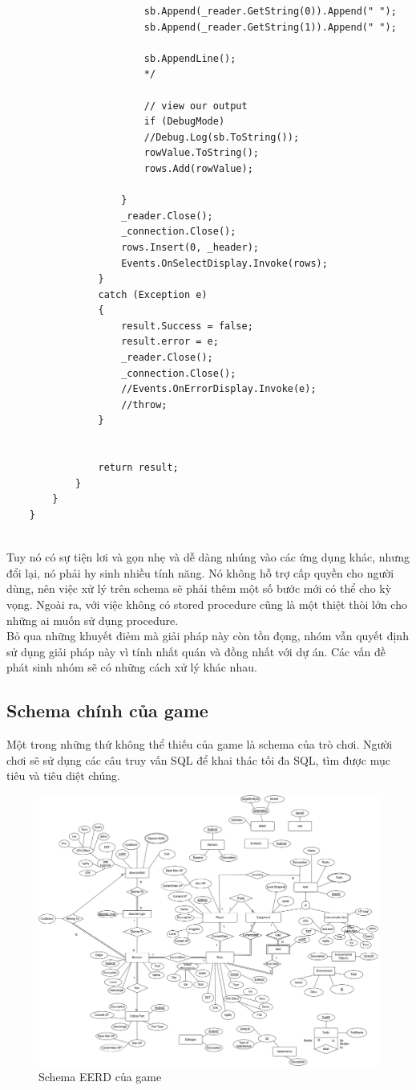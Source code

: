 \begin{verbatim}
						sb.Append(_reader.GetString(0)).Append(" ");
						sb.Append(_reader.GetString(1)).Append(" ");
						
						sb.AppendLine();
						*/
						
						// view our output
						if (DebugMode)
						//Debug.Log(sb.ToString());
						rowValue.ToString();
						rows.Add(rowValue);
						
					}
					_reader.Close();
					_connection.Close();
					rows.Insert(0, _header);
					Events.OnSelectDisplay.Invoke(rows);
				}
				catch (Exception e)
				{
					result.Success = false;
					result.error = e;
					_reader.Close();
					_connection.Close();
					//Events.OnErrorDisplay.Invoke(e);
					//throw;
				}
				
				
				return result;
			}
		}
	}
	
\end{verbatim}
\hspace*{0.5cm} Tuy nó có sự tiện lơi và gọn nhẹ và dễ dàng nhúng vào các ứng dụng khác, nhưng đổi lại, nó phải hy sinh nhiều tính năng. Nó không hỗ trợ cấp quyền cho người dùng, nên việc xử lý trên schema sẽ phải thêm một số bước mới có thể cho kỳ vọng. Ngoài ra, với việc không có stored procedure cũng là một thiệt thòi lớn cho những ai muốn sử dụng procedure.\\
\hspace*{0.5cm} Bỏ qua những khuyết điẻm mà giải pháp này còn tồn đọng, nhóm vẫn quyết định sử dụng giải pháp này vì tính nhất quán và đồng nhất với dự án. Các vấn đề phát sinh nhóm sẽ có những cách xử lý khác nhau.
\subsection{Schema chính của game}
\hspace*{0.5cm} Một trong những thứ không thể thiếu của game là schema của trò chơi. Người chơi sẽ sử dụng các câu truy vấn SQL để khai thác tối đa SQL, tìm được mục tiêu và tiêu diệt chúng.
\begin{figure}[H]
	\centering
	\includegraphics[width=\textwidth]{Images/SchemaEERD.png}
	\vspace{0.5cm}
	\caption{Schema EERD của game}
\end{figure}
